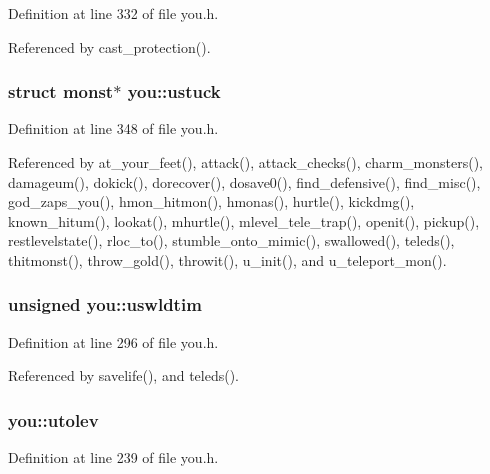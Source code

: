 Definition at line 332 of file you.\+h.



Referenced by cast\+\_\+protection().

\hypertarget{structyou_a774d4dad2da130ec9ed1d2e6c5e0fa80}{
\subsubsection[{ustuck}]{\setlength{\rightskip}{0pt plus 5cm}struct {\bf monst}$\ast$ you\+::ustuck}}\label{structyou_a774d4dad2da130ec9ed1d2e6c5e0fa80}


Definition at line 348 of file you.\+h.



Referenced by at\+\_\+your\+\_\+feet(), attack(), attack\+\_\+checks(), charm\+\_\+monsters(), damageum(), dokick(), dorecover(), dosave0(), find\+\_\+defensive(), find\+\_\+misc(), god\+\_\+zaps\+\_\+you(), hmon\+\_\+hitmon(), hmonas(), hurtle(), kickdmg(), known\+\_\+hitum(), lookat(), mhurtle(), mlevel\+\_\+tele\+\_\+trap(), openit(), pickup(), restlevelstate(), rloc\+\_\+to(), stumble\+\_\+onto\+\_\+mimic(), swallowed(), teleds(), thitmonst(), throw\+\_\+gold(), throwit(), u\+\_\+init(), and u\+\_\+teleport\+\_\+mon().

\hypertarget{structyou_a774f55da1afa57f6bfe3f26908249e35}{
\subsubsection[{uswldtim}]{\setlength{\rightskip}{0pt plus 5cm}unsigned you\+::uswldtim}}\label{structyou_a774f55da1afa57f6bfe3f26908249e35}


Definition at line 296 of file you.\+h.



Referenced by savelife(), and teleds().

\hypertarget{structyou_aa10ab31a66652ba49a9241c92ddb68b0}{
\subsubsection[{utolev}]{ you\+::utolev}}\label{structyou_aa10ab31a66652ba49a9241c92ddb68b0}


Definition at line 239 of file you.\+h.



